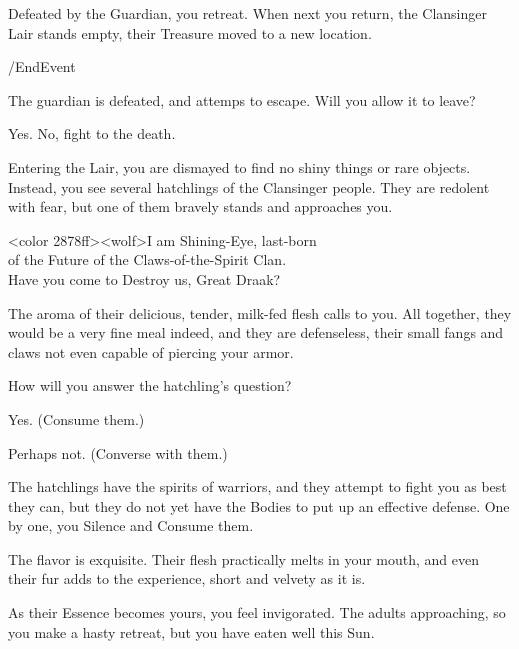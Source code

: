 Defeated by the Guardian, you retreat. When next you return, the Clansinger Lair
stands empty, their Treasure moved to a new location.

\option /EndEvent
  


The guardian is defeated, and attemps to escape. Will you allow it to leave?

\option Yes.  
\option No, fight to the death. 



 
Entering the Lair, you are dismayed to find no shiny things or rare objects.
Instead, you see several hatchlings of the Clansinger people. They are redolent
with fear, but one of them bravely stands and approaches you.

<color 2878ff><wolf>I am Shining-Eye, last-born\\
of the Future of the Claws-of-the-Spirit Clan.\\
Have you come to Destroy us, Great Draak?

The aroma of their delicious, tender, milk-fed flesh calls to you. All together,
they would be a very fine meal indeed, and they are defenseless, their small
fangs and claws not even capable of piercing your armor.

How will you answer the hatchling's question?

\option Yes. (Consume them.)
	  

\option Perhaps not. (Converse with them.) 


The hatchlings have the spirits of warriors, and they attempt to fight you as
best they can, but they do not yet have the Bodies to put up an effective
defense. One by one, you Silence and Consume them.

The flavor is exquisite. Their flesh practically melts in your mouth, and even
their fur adds to the experience, short and velvety as it is.

As their Essence becomes yours, you feel invigorated. The adults approaching, so
you make a hasty retreat, but you have eaten well this Sun.

